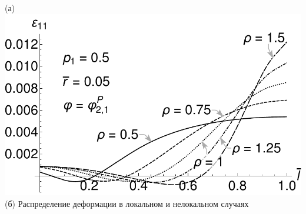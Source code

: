 \begin{frame}
\begin{minipage}{0.39\textwidth}
	(а) \\
	\includegraphics[width=\textwidth]{pics/KirshABEps11r005p05.pdf} \\
	(б)
	Распределение деформации в локальном и нелокальном случаях
\end{minipage}
\end{frame}


